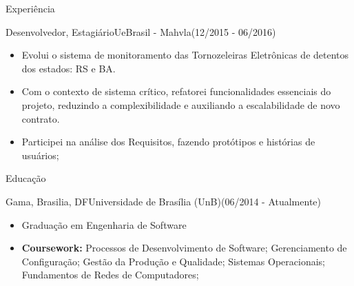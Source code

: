 \documentclass[]{fraguilarcv}
\begin{document}
\begin{cvsection}{Experiência}
		\begin{cvsubsection}{Desenvolvedor, Estagiário}{UeBrasil - Mahvla}{(12/2015 - 06/2016)}
			\begin{itemize}
				\item Evolui o sistema de monitoramento das Tornozeleiras Eletrônicas de detentos dos estados: RS e BA.
	      		\item Com o contexto de sistema crítico, refatorei funcionalidades essenciais do projeto, reduzindo a complexibilidade e auxiliando a escalabilidade de novo contrato.
	      		\item Participei na análise dos Requisitos, fazendo protótipos e histórias de usuários;
			\end{itemize}
		\end{cvsubsection}

	\begin{cvsection}{Educação}
		\begin{cvsubsection}{Gama, Brasilia, DF}{Universidade de Brasília (UnB)}{(06/2014 - Atualmente)}
			\begin{itemize}
				\item Graduação em Engenharia de Software
				\item \textbf{Coursework:} {Processos de Desenvolvimento de Software; Gerenciamento de Configuração; Gestão da Produção e Qualidade; Sistemas Operacionais; Fundamentos de Redes de Computadores;}
			\end{itemize}
		\end{cvsubsection}
	\end{cvsection}


\end{cvsection}
\end{document}
